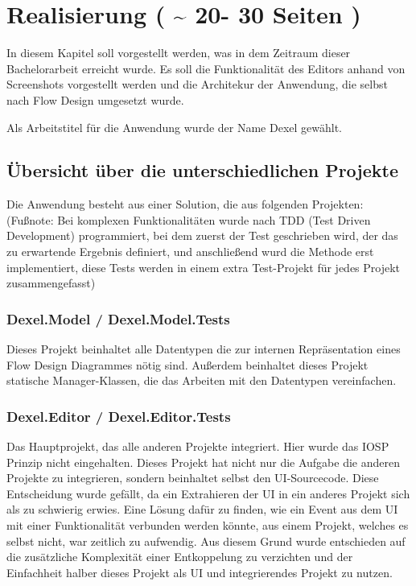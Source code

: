 
\section{Realisierung ( \textasciitilde{} 20- 30 Seiten )}
\label{sec:orgheadline54}
In diesem Kapitel soll vorgestellt werden, was in dem Zeitraum dieser
Bachelorarbeit erreicht wurde. Es soll die Funktionalität des Editors
anhand von Screenshots vorgestellt werden und die Architekur der Anwendung, die selbst nach
Flow Design umgesetzt wurde. 

Als Arbeitstitel für die Anwendung wurde der Name Dexel gewählt.

\subsection{Übersicht über die unterschiedlichen Projekte}
\label{sec:orgheadline5}

Die Anwendung besteht aus einer Solution, die aus folgenden Projekten:
(Fußnote: Bei komplexen Funktionalitäten wurde nach TDD (Test Driven Development)
programmiert, bei dem zuerst der Test geschrieben wird, der das zu erwartende
Ergebnis definiert, und anschließend wurd die Methode erst implementiert, diese
Tests werden in einem extra Test-Projekt für jedes Projekt zusammengefasst)

\subsubsection{Dexel.Model / Dexel.Model.Tests}
\label{sec:orgheadline1}
Dieses Projekt beinhaltet alle Datentypen die zur internen Repräsentation
eines Flow Design Diagrammes nötig sind. Außerdem beinhaltet dieses Projekt
statische Manager-Klassen, die das Arbeiten mit den Datentypen vereinfachen.

\subsubsection{Dexel.Editor / Dexel.Editor.Tests}
\label{sec:orgheadline2}
Das Hauptprojekt, das alle anderen Projekte integriert. Hier wurde das IOSP
Prinzip nicht eingehalten. Dieses Projekt hat nicht nur die Aufgabe die
anderen Projekte zu integrieren, sondern beinhaltet selbst den
UI-Sourcecode. Diese Entscheidung wurde gefällt, da ein Extrahieren der UI
in ein anderes Projekt sich als zu schwierig erwies. Eine Lösung dafür zu
finden, wie ein Event aus dem UI mit einer Funktionalität verbunden werden
könnte, aus einem Projekt, welches es selbst nicht, war zeitlich zu
aufwendig. Aus diesem Grund wurde entschieden auf die zusätzliche
Komplexität einer Entkoppelung zu verzichten und der Einfachheit halber
dieses Projekt als UI und integrierendes Projekt zu nutzen.

